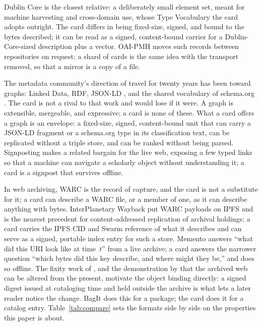 \documentclass[11pt]{article}
\begin{document}
Dublin Core \citep{Kunze:2007} is the closest relative: a deliberately small
element set, meant for machine harvesting and cross-domain use, whose Type
Vocabulary the card adopts outright. The card differs in being fixed-size,
signed, and bound to the bytes described; it can be read as a signed,
content-bound carrier for a Dublin-Core-sized description plus a vector.
OAI-PMH \citep{Lagoze:2001} moves such records between repositories on request;
a shard of cards is the same idea with the transport removed, so that a mirror
is a copy of a file.

The metadata community's direction of travel for twenty years has been toward
graphs: Linked Data, RDF, JSON-LD \citep{Kellogg:2020}, and the shared
vocabulary of schema.org \citep{Guha:2016}. The card is not a rival to that
work and would lose if it were. A graph is extensible, mergeable, and
expressive; a card is none of these. What a card offers a graph is an
envelope: a fixed-size, signed, content-bound unit that can carry a JSON-LD
fragment or a schema.org type in its classification text, can be replicated
without a triple store, and can be ranked without being parsed. Signposting
\citep{VanDeSompel:2015} makes a related bargain for the live web, exposing a
few typed links so that a machine can navigate a scholarly object without
understanding it; a card is a signpost that survives offline.

In web archiving, WARC \citep{ISO:2017} is the record of capture, and the card
is not a substitute for it; a card can describe a WARC file, or a member of
one, as it can describe anything with bytes. InterPlanetary Wayback
\citep{Alam:2016} put WARC payloads on IPFS and is the nearest precedent for
content-addressed replication of archival holdings; a card carries the IPFS
CID and Swarm reference of what it describes and can serve as a signed,
portable index entry for such a store. Memento \citep{VanDeSompel:2013} answers
``what did this URI look like at time~$t$'' from a live archive; a card
answers the narrower question ``which bytes did this key describe, and where
might they be,'' and does so offline. The fixity work of \citet{Aturban:2019},
and the demonstration by \citet{Lerner:2017} that the archived web can be
altered from the present, motivate the object binding directly: a signed
digest issued at cataloging time and held outside the archive is what lets a
later reader notice the change. BagIt \citep{Kunze:2018} does this for a
package; the card does it for a catalog entry. Table~\ref{tab:compare} sets
the formats side by side on the properties this paper is about.
\end{document}
